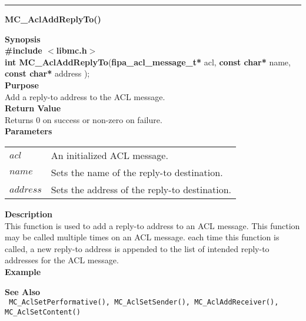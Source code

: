 \noindent
\vspace{5pt}
\rule{6.5in}{0.015in}
\noindent
{}
{\LARGE \bf MC\_AclAddReplyTo()}\\
\label{api:MC_Acl_AddReplyTo()}

\noindent
{\bf Synopsis}\\
{\bf \#include $<$libmc.h$>$}\\
{\bf int MC\_AclAddReplyTo}({\bf fipa\_acl\_message\_t*} acl, {\bf const char*} name, {\bf const char*} address );\\

\noindent
{\bf Purpose}\\
Add a reply-to address to the ACL message.\\

\noindent
{\bf Return Value}\\
Returns 0 on success or non-zero on failure. \\

\noindent
{\bf Parameters}
\vspace{-0.1in}
\begin{description}
\item
\begin{tabular}{p{10 mm}p{145 mm}} 
$acl$ & An initialized ACL message. \\
$name$ & Sets the name of the reply-to destination. \\
$address$ & Sets the address of the reply-to destination. 
\end{tabular}
\end{description}

\noindent
{\bf Description}\\
This function is used to add a reply-to address to an ACL message. This function 
may be called multiple times on an ACL message. each time this function is 
called, a new reply-to address is appended to the list of intended reply-to
addresses for the ACL message. \\

\noindent
{\bf Example}\\
\noindent
{\footnotesize}

\noindent
{\bf See Also}\\
\texttt{
  MC\_AclSetPerformative(), MC\_AclSetSender(), MC\_AclAddReceiver(), \linebreak
    MC\_AclSetContent()
}

